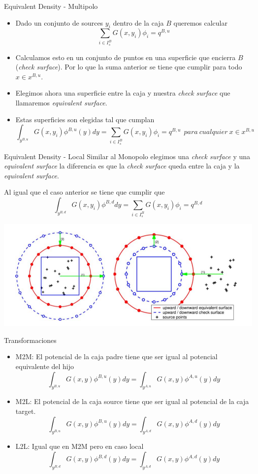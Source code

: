 \documentclass{beamer}
\begin{document}
\begin{frame}{Equivalent Density - Multipolo}
\begin{itemize}
    \item Dado un conjunto de sources $y_i$ dentro de la caja $B$ queremos calcular 
    $$\displaystyle \sum_{i \in I_s^B} G(x,y_i) \phi_i = q^{B,u}$$
    \item Calculamos esto en un conjunto de puntos en una superficie que encierra $B$ (\textit{check surface}).
    Por lo que la suma anterior se tiene que cumplir para todo $x \in x^{B,u}$.
    \item Elegimos ahora una superficie entre la caja y nuestra \textit{check surface} que llamaremos \textit{equivalent surface}.
    \item Estas superficies son elegidas tal que cumplan 
    $$\int_{y^{B,u}}  G(x,y_i) \phi^{B,u}(y) dy= \sum_{i\in I^{B}_s} G(x,y_i) \phi_i = q^{B,u} \ \ para \ cualquier \ x \in x^{B,u} $$
\end{itemize}

\end{frame}
\begin{frame}{Equivalent Density - Local}
 Similar al Monopolo elegimos una \textit{check surface} y una \textit{equivalent surface} la diferencia es que la \textit{check surface} queda entre la caja y la \textit{equivalent surface}.
 
 Al igual que el caso anterior se tiene que cumplir que 
  $$\int_{y^{B,d}}  G(x,y_i) \phi^{B,d} dy = \sum_{i\in I^{B}_s} G(x,y_i) \phi_i = q^{B,d} $$

\end{frame}
\begin{frame}
 \begin{center}
 \includegraphics[scale=0.4]{densities.png}
 \end{center}
\end{frame}
\begin{frame}{Transformaciones}
\begin{itemize}
    \item M2M: El potencial de la caja padre tiene que ser igual al potencial equivalente del hijo
    $$ \int_{y^{B,u}} G(x,y) \phi^{B,u}(y) dy = \int_{y^{A,u}} G(x,y) \phi^{A,u}(y) dy$$
    \item M2L: El potencial de la caja source tiene que ser igual al potencial de la caja target.
    $$ \int_{y^{B,u}} G(x,y) \phi^{B,u}(y) dy = \int_{y^{A,d}} G(x,y) \phi^{A,d}(y) dy$$
    \item L2L: Igual que en M2M pero en caso local
    $$ \int_{y^{B,d}} G(x,y) \phi^{B,d}(y) dy = \int_{y^{A,d}} G(x,y) \phi^{A,d}(y) dy$$
\end{itemize}
\end{frame}
\end{document}
